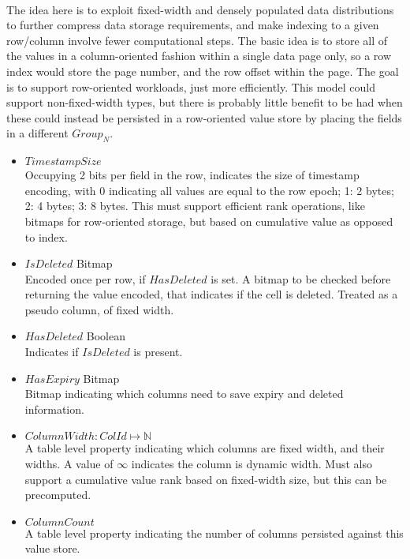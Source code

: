 \documentclass[fleqn]{article}
\begin{document}
\paragraph{}
\small
The idea here is to exploit fixed-width and densely populated data distributions to further compress
data storage requirements, and make indexing to a given row/column involve fewer computational steps.
The basic idea is to store all of the values in a column-oriented fashion within a single data page only,
so a row index would store the page number, and the row offset within the page. The goal is to support
row-oriented workloads, just more efficiently. This model could support non-fixed-width types, but there
is probably little benefit to be had when these could instead be persisted in a row-oriented value store
by placing the fields in a different $Group_N$.
 \begin{itemize}
  \item $TimestampSize$\\[2pt]
    Occupying 2 bits per field in the row, indicates the size of timestamp encoding, with 0 indicating
    all values are equal to the row epoch; 1: 2 bytes; 2: 4 bytes; 3: 8 bytes.
    This must support efficient rank operations, like bitmaps for row-oriented storage, but based on
    cumulative value as opposed to index.
  \item $IsDeleted$ Bitmap \\[2pt]
    Encoded once per row, if $HasDeleted$ is set. A bitmap to be checked before returning the value
    encoded, that indicates if the cell is deleted. Treated as a pseudo column, of fixed width.
  \item $HasDeleted$ Boolean \\[2pt]
    Indicates if $IsDeleted$ is present.
  \item $HasExpiry$ Bitmap\\[2pt]
    Bitmap indicating which columns need to save expiry and deleted information.
  \item $ColumnWidth : ColId \mapsto \mathbb{N}$\\[2pt]
    A table level property indicating which columns are fixed width, and their widths. A value of $\infty$
    indicates the column is dynamic width. Must also support a cumulative value rank based on fixed-width size, 
    but this can be precomputed.
  \item $ColumnCount$\\[2pt]
    A table level property indicating the number of columns persisted against this value store.
\end{itemize}
\end{document}
